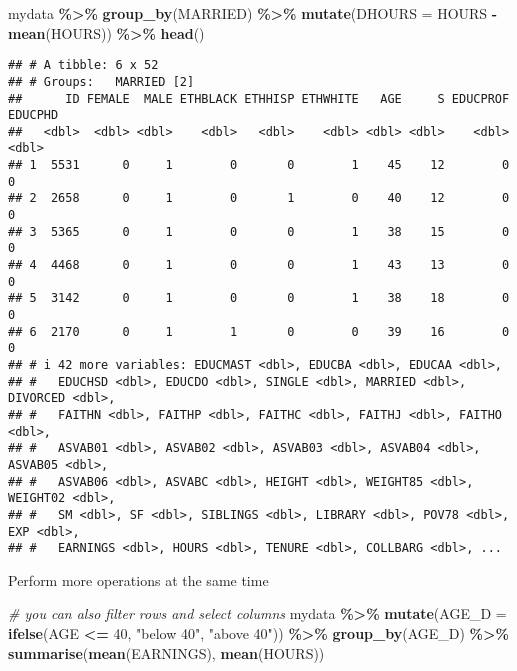 \documentclass[
]{article}
\newenvironment{Shaded}{\begin{snugshade}}{\end{snugshade}}
\newcommand{\AttributeTok}[1]{\textcolor[rgb]{0.13,0.29,0.53}{#1}}
\newcommand{\CommentTok}[1]{\textcolor[rgb]{0.56,0.35,0.01}{\textit{#1}}}
\newcommand{\DecValTok}[1]{\textcolor[rgb]{0.00,0.00,0.81}{#1}}
\newcommand{\FunctionTok}[1]{\textcolor[rgb]{0.13,0.29,0.53}{\textbf{#1}}}
\newcommand{\NormalTok}[1]{#1}
\newcommand{\SpecialCharTok}[1]{\textcolor[rgb]{0.81,0.36,0.00}{\textbf{#1}}}
\newcommand{\StringTok}[1]{\textcolor[rgb]{0.31,0.60,0.02}{#1}}
\begin{document}
\begin{Shaded}
\begin{Highlighting}[]
\NormalTok{mydata }\SpecialCharTok{\%\textgreater{}\%} 
  \FunctionTok{group\_by}\NormalTok{(MARRIED) }\SpecialCharTok{\%\textgreater{}\%}
  \FunctionTok{mutate}\NormalTok{(}\AttributeTok{DHOURS =}\NormalTok{ HOURS }\SpecialCharTok{{-}} \FunctionTok{mean}\NormalTok{(HOURS)) }\SpecialCharTok{\%\textgreater{}\%}
  \FunctionTok{head}\NormalTok{()}
\end{Highlighting}
\end{Shaded}

\begin{verbatim}
## # A tibble: 6 x 52
## # Groups:   MARRIED [2]
##      ID FEMALE  MALE ETHBLACK ETHHISP ETHWHITE   AGE     S EDUCPROF EDUCPHD
##   <dbl>  <dbl> <dbl>    <dbl>   <dbl>    <dbl> <dbl> <dbl>    <dbl>   <dbl>
## 1  5531      0     1        0       0        1    45    12        0       0
## 2  2658      0     1        0       1        0    40    12        0       0
## 3  5365      0     1        0       0        1    38    15        0       0
## 4  4468      0     1        0       0        1    43    13        0       0
## 5  3142      0     1        0       0        1    38    18        0       0
## 6  2170      0     1        1       0        0    39    16        0       0
## # i 42 more variables: EDUCMAST <dbl>, EDUCBA <dbl>, EDUCAA <dbl>,
## #   EDUCHSD <dbl>, EDUCDO <dbl>, SINGLE <dbl>, MARRIED <dbl>, DIVORCED <dbl>,
## #   FAITHN <dbl>, FAITHP <dbl>, FAITHC <dbl>, FAITHJ <dbl>, FAITHO <dbl>,
## #   ASVAB01 <dbl>, ASVAB02 <dbl>, ASVAB03 <dbl>, ASVAB04 <dbl>, ASVAB05 <dbl>,
## #   ASVAB06 <dbl>, ASVABC <dbl>, HEIGHT <dbl>, WEIGHT85 <dbl>, WEIGHT02 <dbl>,
## #   SM <dbl>, SF <dbl>, SIBLINGS <dbl>, LIBRARY <dbl>, POV78 <dbl>, EXP <dbl>,
## #   EARNINGS <dbl>, HOURS <dbl>, TENURE <dbl>, COLLBARG <dbl>, ...
\end{verbatim}

Perform more operations at the same time

\begin{Shaded}
\begin{Highlighting}[]
\CommentTok{\# you can also \textquotesingle{}filter\textquotesingle{} rows and \textquotesingle{}select\textquotesingle{} columns}
\NormalTok{mydata }\SpecialCharTok{\%\textgreater{}\%}
  \FunctionTok{mutate}\NormalTok{(}\AttributeTok{AGE\_D =} \FunctionTok{ifelse}\NormalTok{(AGE }\SpecialCharTok{\textless{}=} \DecValTok{40}\NormalTok{, }\StringTok{"below 40"}\NormalTok{, }\StringTok{"above 40"}\NormalTok{)) }\SpecialCharTok{\%\textgreater{}\%}
  \FunctionTok{group\_by}\NormalTok{(AGE\_D) }\SpecialCharTok{\%\textgreater{}\%}
  \FunctionTok{summarise}\NormalTok{(}\FunctionTok{mean}\NormalTok{(EARNINGS), }\FunctionTok{mean}\NormalTok{(HOURS))}
\end{Highlighting}
\end{Shaded}
\end{document}
